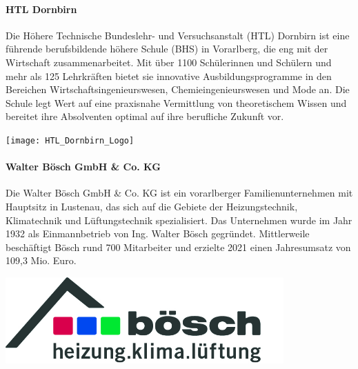 \paragraph{HTL Dornbirn}
\vspace{1ex}
\begin{minipage}{0.6\textwidth}
    Die Höhere Technische Bundeslehr- und Versuchsanstalt (HTL) Dornbirn ist eine führende berufsbildende höhere Schule (BHS) in Vorarlberg, die eng mit der Wirtschaft zusammenarbeitet. Mit über 1100 Schülerinnen und Schülern und mehr als 125 Lehrkräften bietet sie innovative Ausbildungsprogramme in den Bereichen Wirtschaftsingenieurswesen, Chemieingenieurswesen und Mode an. Die Schule legt Wert auf eine praxisnahe Vermittlung von theoretischem Wissen und bereitet ihre Absolventen optimal auf ihre berufliche Zukunft vor.
\end{minipage}%
\hfill
\begin{minipage}{0.37\textwidth}
	\centering	
	\texttt{[image: HTL\_Dornbirn\_Logo]}
\end{minipage}
\vspace{1ex}

\paragraph{Walter Bösch GmbH \& Co. KG}
\vspace{1ex}
\begin{minipage}{0.6\textwidth}
Die Walter Bösch GmbH \& Co. KG ist ein vorarlberger Familienunternehmen mit Hauptsitz in Lustenau, das sich auf die Gebiete der Heizungstechnik, Klimatechnik und Lüftungstechnik spezialisiert. Das Unternehmen wurde im Jahr 1932 als Einmannbetrieb von Ing. Walter Bösch gegründet. Mittlerweile beschäftigt Bösch rund 700 Mitarbeiter und erzielte 2021 einen Jahresumsatz von 109,3 Mio. Euro. \cite[vgl.][]{walter_boesch:o.J.}
\end{minipage}%
\hfill
\begin{minipage}{0.37\textwidth}
	\centering	
	\includegraphics[width=0.8\textwidth]{boesch_logo_original}
\end{minipage}

